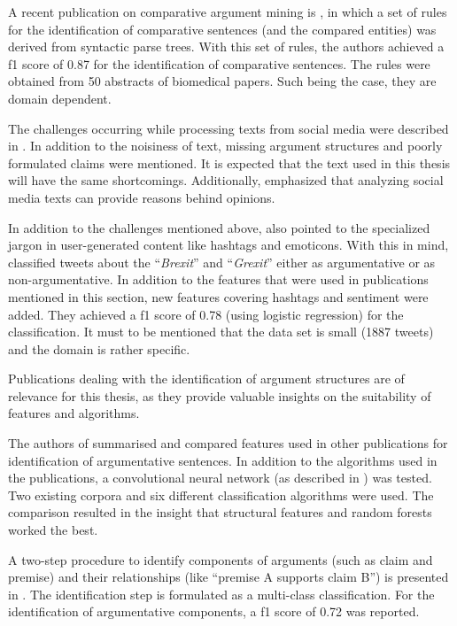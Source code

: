 A recent publication on comparative argument mining is \cite{gupta2017identifying}, in which a set of rules for the identification of comparative sentences (and the compared entities) was derived from syntactic parse trees. With this set of rules, the authors achieved a f1 score of 0.87 for the identification of comparative sentences. The rules were obtained from 50 abstracts of biomedical papers. Such being the case, they are domain dependent.\newline

The challenges occurring while processing texts from social media were described in \cite{Snajder2017Social-Media-Ar}. In addition to the noisiness of text, missing argument structures and poorly formulated claims were mentioned. It is expected that the text used in this thesis will have the same shortcomings. Additionally, \cite{Snajder2017Social-Media-Ar} emphasized that analyzing social media texts can provide reasons behind opinions.

In addition to the challenges mentioned above, \cite{Dusmanu2017Argument-Mining} also pointed to the specialized jargon in user-generated content like hashtags and emoticons. With this in mind, \cite{Dusmanu2017Argument-Mining} classified tweets about the \enquote{\emph{Brexit}} and \enquote{\emph{Grexit}} either as argumentative or as non-argumentative. In addition to the features that were used in publications mentioned in this section, new features covering hashtags and sentiment were added. They achieved a f1 score of 0.78 (using logistic regression) for the classification. It must to be mentioned that the data set is small (1887 tweets) and the domain is rather specific.\newline

Publications dealing with the identification of argument structures are of relevance for this thesis, as they provide valuable insights on the suitability of features and algorithms.

The authors of \cite{Aker2017What-works-and-} summarised and compared features used in other publications for identification of argumentative sentences. In addition to the algorithms used in the publications, a convolutional neural network (as described in \cite{Kim2014Convolutional-N}) was tested. Two existing corpora and six different classification algorithms were used. The comparison resulted in the insight that structural features and random forests worked the best.

A two-step procedure to identify components of arguments (such as claim and premise) and their relationships (like \enquote{premise A supports claim B}) is presented in \cite{Stab2014Identifying-Arg}. The identification step is formulated as a multi-class classification. For the identification of argumentative components, a f1 score of 0.72 was reported.

